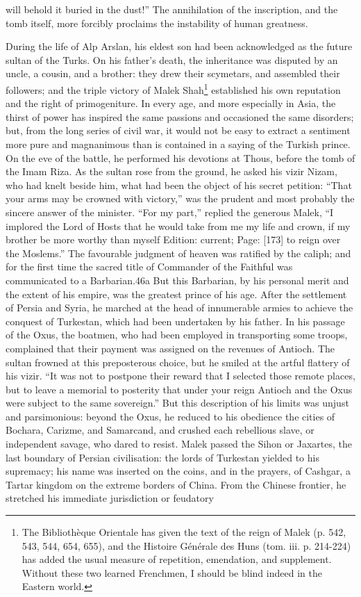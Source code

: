 will behold it buried in the dust!\texthebrew{}” The annihilation of the inscription, and the tomb itself, more forcibly proclaims the instability of human greatness.

During the life of Alp Arslan, his eldest son had been acknowledged as the future sultan of the Turks. On his father\texthebrew{}’s death, the inheritance was disputed by an uncle, a cousin, and a brother: they drew their scymetars, and assembled their followers; and the triple victory of Malek Shah\footnote{The Bibliothèque Orientale has given the text of the reign of Malek (p. 542, 543, 544, 654, 655), and the Histoire Générale des Huns (tom. iii. p. 214-224) has added the usual measure of repetition, emendation, and supplement. Without these two learned Frenchmen, I should be blind indeed in the Eastern world.} established his own reputation and the right of primogeniture. In every age, and more especially in Asia, the thirst of power has inspired the same passions and occasioned the same disorders; but, from the long series of civil war, it would not be easy to extract a sentiment more pure and magnanimous than is contained in a saying of the Turkish prince. On the eve of the battle, he performed his devotions at Thous, before the tomb of the Imam Riza. As the sultan rose from the ground, he asked his vizir Nizam, who had knelt beside him, what had been the object of his secret petition: \texthebrew{“}That your arms may be crowned with victory,\texthebrew{}” was the prudent and most probably the sincere answer of the minister. \texthebrew{“}For my part,\texthebrew{}” replied the generous Malek, \texthebrew{“}I implored the Lord of Hosts that he would take from me my life and crown, if my brother be more worthy than myself Edition: current; Page: [173] to reign over the Moslems.\texthebrew{}” The favourable judgment of heaven was ratified by the caliph; and for the first time the sacred title of Commander of the Faithful was communicated to a Barbarian.46a But this Barbarian, by his personal merit and the extent of his empire, was the greatest prince of his age. After the settlement of Persia and Syria, he marched at the head of innumerable armies to achieve the conquest of Turkestan, which had been undertaken by his father. In his passage of the Oxus, the boatmen, who had been employed in transporting some troops, complained that their payment was assigned on the revenues of Antioch. The sultan frowned at this preposterous choice, but he smiled at the artful flattery of his vizir. \texthebrew{“}It was not to postpone their reward that I selected those remote places, but to leave a memorial to posterity that under your reign Antioch and the Oxus were subject to the same sovereign.\texthebrew{}” But this description of his limits was unjust and parsimonious: beyond the Oxus, he reduced to his obedience the cities of Bochara, Carizme, and Samarcand, and crushed each rebellious slave, or independent savage, who dared to resist. Malek passed the Sihon or Jaxartes, the last boundary of Persian civilisation: the lords of Turkestan yielded to his supremacy; his name was inserted on the coins, and in the prayers, of Cashgar, a Tartar kingdom on the extreme borders of China. From the Chinese frontier, he stretched his immediate jurisdiction or feudatory 